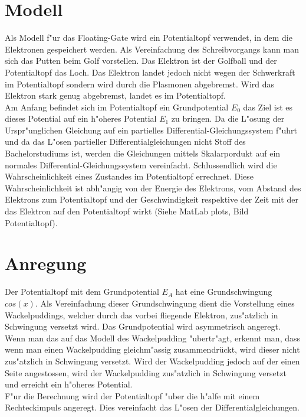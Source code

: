 \begin{refsection}
\section{Modell}
Als Modell f"ur das Floating-Gate wird ein Potentialtopf verwendet, in dem die Elektronen gespeichert werden. 
Als Vereinfachung des Schreibvorgangs kann man sich das Putten beim Golf vorstellen. Das Elektron ist der Golfball und der Potentialtopf das Loch. Das Elektron landet jedoch nicht wegen der Schwerkraft im Potentialtopf sondern wird durch die Plasmonen abgebremst. Wird das Elektron stark genug abgebremst, landet es im Potentialtopf.\\
Am Anfang befindet sich im Potentialtopf ein Grundpotential $E_{0}$ das Ziel ist es dieses Potential auf ein h"oheres Potential $E_{1}$ zu bringen. Da die L"osung der Urspr"unglichen Gleichung auf ein partielles Differential-Gleichungssystem f"uhrt und da das L"osen partieller Differentialgleichungen nicht Stoff des Bachelorstudiums ist, werden die Gleichungen mittels Skalarpordukt auf ein normales Differential-Gleichungssystem vereinfacht. Schlussendlich wird die Wahrscheinlichkeit eines Zustandes im Potentialtopf errechnet. Diese Wahrscheinlichkeit ist abh"angig von der Energie des Elektrons, vom Abstand des Elektrons zum Potentialtopf und der Geschwindigkeit respektive der Zeit mit der das Elektron auf den Potentialtopf wirkt (Siehe MatLab plots, Bild Potentialtopf).


\section{Anregung}
Der Potentialtopf mit dem Grundpotential $E_{A}$ hat eine Grundschwingung $cos(x)$.
Als Vereinfachung dieser Grundschwingung dient die Vorstellung eines Wackelpuddings, welcher durch das vorbei fliegende Elektron, zus"atzlich in Schwingung versetzt wird. 
Das Grundpotential wird asymmetrisch angeregt. Wenn man das auf das Modell des Wackelpudding "ubertr"agt, erkennt man, dass wenn man einen Wackelpudding gleichm"assig zusammendrückt, wird dieser nicht zus"atzlich in Schwingung versetzt. Wird der Wackelpudding jedoch auf der einen Seite angestossen, wird der Wackelpudding zus"atzlich in Schwingung versetzt und erreicht ein h"oheres Potential.\\
F"ur die Berechnung wird der Potentialtopf "uber die h"alfe mit einem Rechteckimpuls angeregt. Dies vereinfacht das L"osen der Differentialgleichungen.


\end{refsection}
